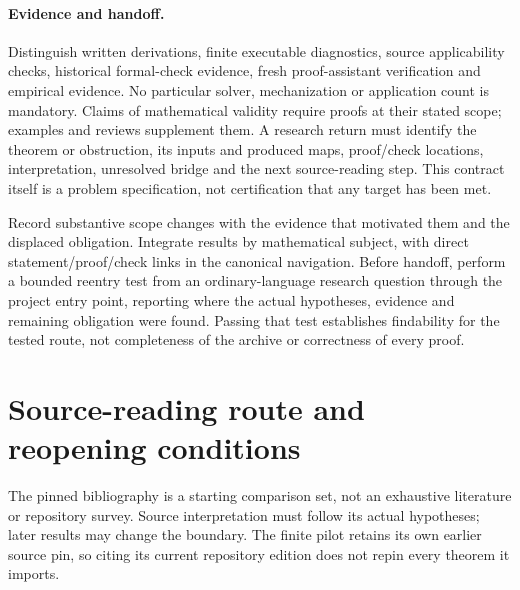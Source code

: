 \documentclass[11pt]{article}
\begin{document}
\paragraph{Evidence and handoff.}
Distinguish written derivations, finite executable diagnostics, source applicability checks, historical formal-check evidence, fresh proof-assistant verification and empirical evidence. No particular solver, mechanization or application count is mandatory. Claims of mathematical validity require proofs at their stated scope; examples and reviews supplement them. A research return must identify the theorem or obstruction, its inputs and produced maps, proof/check locations, interpretation, unresolved bridge and the next source-reading step. This contract itself is a problem specification, not certification that any target has been met.

Record substantive scope changes with the evidence that motivated them and the displaced obligation. Integrate results by mathematical subject, with direct statement/proof/check links in the canonical navigation. Before handoff, perform a bounded reentry test from an ordinary-language research question through the project entry point, reporting where the actual hypotheses, evidence and remaining obligation were found. Passing that test establishes findability for the tested route, not completeness of the archive or correctness of every proof.

\clearpage
\section{Source-reading route and reopening conditions}\label{sec:sources}

The pinned bibliography is a starting comparison set, not an exhaustive literature or repository survey. Source interpretation must follow its actual hypotheses; later results may change the boundary. The finite pilot retains its own earlier source pin, so citing its current repository edition does not repin every theorem it imports.
\end{document}
